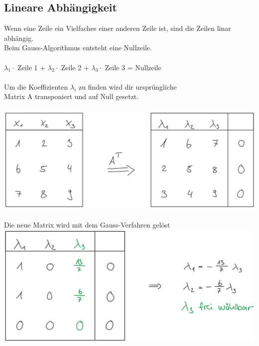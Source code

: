 			
			
					    
		    
		    
		    
		    \subsection{Lineare Abhängigkeit}
		    Wenn eine Zeile ein Vielfaches einer anderen Zeile ist, sind die Zeilen linar abhängig. \\
		    Beim Gauss-Algorithmus entsteht eine Nullzeile. \\
		    \\
		    $\lambda_1 \cdot$ Zeile 1 + $\lambda_2 \cdot$ Zeile 2 + $\lambda_3 \cdot$ Zeile 3 = Nullzeile \\
		    \\
		    Um die Koeffizienten $\lambda_i$ zu finden wird dir ursprüngliche \\
		    Matrix A transponiert und auf Null gesetzt. \\
		    \\
		    \includegraphics[width=0.5\linewidth]{Bilder/lineare-abhaengigkeit_1} \\
		    \\
		    Die neue Matrix wird mit dem Gauss-Verfahren gelöst\\
		    
		    \includegraphics[width=0.5\linewidth]{Bilder/lineare-abhaengigkeit_2} \\
		    
		    
		    
